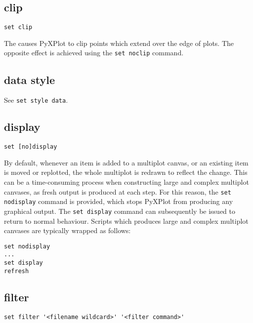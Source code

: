 \subsection{clip}

\begin{verbatim}
set clip
\end{verbatim}

The  causes PyXPlot to clip points which extend over the edge
of plots. The opposite effect is achieved using the {\tt set noclip}
command.


\subsection{data style}

See {\tt set style data}.


\subsection{display}

\begin{verbatim}
set [no]display
\end{verbatim}

By default, whenever an item is added to a multiplot canvas, or an existing
item is moved or replotted, the whole multiplot is redrawn to reflect the
change.  This can be a time-consuming process when constructing large and
complex multiplot canvases, as fresh output is produced at each step. For this
reason, the {\tt set nodisplay} command is provided, which stops PyXPlot from
producing any graphical output. The {\tt set display} command can subsequently
be issued to return to normal behaviour. Scripts which produces large and
complex multiplot canvases are typically wrapped as follows:

\begin{verbatim}
set nodisplay
...
set display
refresh
\end{verbatim}


\subsection{filter}

\begin{verbatim}
set filter '<filename wildcard>' '<filter command>'
\end{verbatim}

